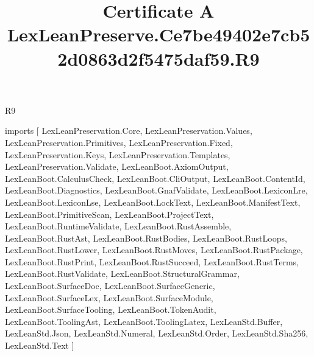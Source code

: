 \begin{lexlean}{R9}
\title{Certificate A LexLeanPreserve.Ce7be49402e7cb52d0863d2f5475daf59.R9}
\begin{coremodule}
imports [
  LexLeanPreservation.Core,
  LexLeanPreservation.Values,
  LexLeanPreservation.Primitives,
  LexLeanPreservation.Fixed,
  LexLeanPreservation.Keys,
  LexLeanPreservation.Templates,
  LexLeanPreservation.Validate,
  LexLeanBoot.AxiomOutput,
  LexLeanBoot.CalculusCheck,
  LexLeanBoot.CliOutput,
  LexLeanBoot.ContentId,
  LexLeanBoot.Diagnostics,
  LexLeanBoot.GnafValidate,
  LexLeanBoot.LexiconLre,
  LexLeanBoot.LexiconLse,
  LexLeanBoot.LockText,
  LexLeanBoot.ManifestText,
  LexLeanBoot.PrimitiveScan,
  LexLeanBoot.ProjectText,
  LexLeanBoot.RuntimeValidate,
  LexLeanBoot.RustAssemble,
  LexLeanBoot.RustAst,
  LexLeanBoot.RustBodies,
  LexLeanBoot.RustLoops,
  LexLeanBoot.RustLower,
  LexLeanBoot.RustMoves,
  LexLeanBoot.RustPackage,
  LexLeanBoot.RustPrint,
  LexLeanBoot.RustSucceed,
  LexLeanBoot.RustTerms,
  LexLeanBoot.RustValidate,
  LexLeanBoot.StructuralGrammar,
  LexLeanBoot.SurfaceDoc,
  LexLeanBoot.SurfaceGeneric,
  LexLeanBoot.SurfaceLex,
  LexLeanBoot.SurfaceModule,
  LexLeanBoot.SurfaceTooling,
  LexLeanBoot.TokenAudit,
  LexLeanBoot.ToolingAst,
  LexLeanBoot.ToolingLatex,
  LexLeanStd.Buffer,
  LexLeanStd.Json,
  LexLeanStd.Numeral,
  LexLeanStd.Order,
  LexLeanStd.Sha256,
  LexLeanStd.Text
]


\end{coremodule}
\end{lexlean}
